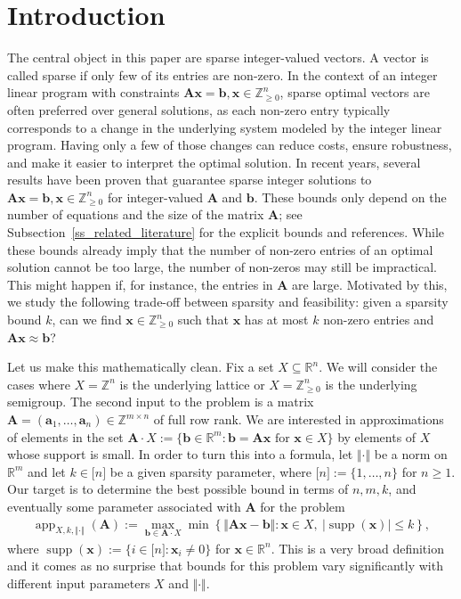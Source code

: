 \documentclass[pdflatex]{sn-jnl}
\DeclareMathOperator{\app}{app}
\DeclareMathOperator{\supp}{supp}
\newcommand{\R}{\mathbb{R}}
\newcommand{\Z}{\mathbb{Z}}
\newcommand{\bA}{\bm{A}}
\newcommand{\bx}{\bm{x}}
\newcommand{\bb}{\bm{b}}
\newcommand{\ba}{\bm{a}}
\theoremstyle{thmstyleone}%
\theoremstyle{thmstyletwo}%
\theoremstyle{thmstylethree}%
\begin{document}
	\section{Introduction}
	The central object in this paper are sparse integer-valued vectors. A vector is called sparse if only few of its entries are non-zero. In the context of an integer linear program with constraints $\bA\bx=\bb, \bx\in\Z^n_{\geq 0}$, sparse optimal vectors are often preferred over general solutions, as each non-zero entry typically corresponds to a change in the underlying system modeled by the integer linear program. Having only a few of those changes can reduce costs, ensure robustness, and make it easier to interpret the optimal solution. In recent years, several results have been proven that guarantee sparse integer solutions to $\bA\bx=\bb, \bx\in\Z^n_{\geq 0}$ for integer-valued $\bA$ and $\bb$. These bounds only depend on the number of equations and the size of the matrix $\bA$; see Subsection~\ref{ss_related_literature} for the explicit bounds and references. While these bounds already imply that the number of non-zero entries of an optimal solution cannot be too large, the number of non-zeros may still be impractical. This might happen if, for instance, the entries in $\bA$ are large. Motivated by this, we study the following trade-off between sparsity and feasibility: given a sparsity bound $k$, can we find $\bx\in\Z^n_{\geq 0}$ such that $\bx$ has at most $k$ non-zero entries and $\bA\bx \approx \bb$?
	
	
	Let us make this mathematically clean. 
	Fix a set $X\subseteq \R^n$. We will consider the cases where $X = \Z^n$ is the underlying lattice or $X=\Z_{\geq 0}^n $ is the underlying semigroup. 
	The second input to the problem is a matrix
	$\bA = (\ba_1,\ldots,\ba_n)\in\Z^{m\times n}$ of full row rank. We are interested in approximations of elements in the set $\bA\cdot X := \lbrace \bb \in \R^m : \bb = \bA\bx \text{ for }\bx\in X\rbrace$ by elements of $X$ whose support is small. In order to turn this into a formula, let $\Vert\cdot\Vert$ be a norm on $\R^m$ and let $k\in\lbrack n\rbrack$ be a given sparsity parameter, where $\lbrack n\rbrack :=\lbrace 1,\ldots,n\rbrace$ for $n\geq 1$. Our target is to determine the best possible bound in terms of $n,m,k$, and eventually some parameter associated with $\bA$ for the problem 
	\begin{align*}
		\app_{X,k,\Vert\cdot\Vert}(\bA) := \max_{\bb\in \bA\cdot X}\min \left\lbrace \Vert \bA\bx - \bb\Vert : \bx\in X, \ \left|\supp(\bx)\right|\leq k\right\rbrace,
	\end{align*}
	where $\supp(\bx) :=\lbrace i\in\lbrack n\rbrack : \bx_i\neq 0\rbrace$ for $\bx\in\R^n$. 
	This is a very broad definition and it comes as no surprise that bounds for this problem vary significantly with different input parameters $X$ and $\Vert\cdot\Vert$. 
	
\end{document}
